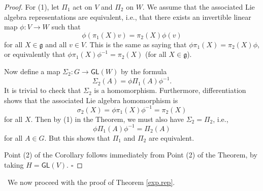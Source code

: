 \documentclass{amsbook}
\let \frak = \mathfrak
\theoremstyle{plain}
\numberwithin{equation}{chapter}
\numberwithin{theorem}{chapter}
\begin{document}
\begin{proof}
For (1), let $\Pi_{1}$ act on $V$ and $\Pi_{2}$ on $W$. We assume that the
associated Lie algebra representations are equivalent, i.e., that there exists
an invertible linear map $\phi:V\rightarrow W$ such that
\[
\phi\left(  \pi_{1}(X)v\right)  =\pi_{2}(X)\phi(v)
\]
for all $X\in\frak{g}$ and all $v\in V$. This is the same as saying that
$\phi\pi_{1}(X)=\pi_{2}(X)\phi$, or equivalently that $\phi\pi_{1}(X)\phi
^{-1}=\pi_{2}(X)$ (for all $X\in\frak{g}$).

Now define a map $\Sigma_{2}:G\rightarrow\mathsf{GL}(W)$ by the formula
\[
\Sigma_{2}(A)=\phi\Pi_{1}(A)\phi^{-1}\text{.}%
\]
It is trivial to check that $\Sigma_{2}$ is a homomorphism. Furthermore,
differentiation shows that the associated Lie algebra homomorphism is
\[
\sigma_{2}(X)=\phi\pi_{1}(X)\phi^{-1}=\pi_{2}(X)
\]
for all $X$. Then by (1) in the Theorem, we must also have $\Sigma_{2}=\Pi
_{2}$, i.e.,
\[
\phi\Pi_{1}(A)\phi^{-1}=\Pi_{2}(A)
\]
for all $A\in G$. But this shows that $\Pi_{1}$ and $\Pi_{2}$ are equivalent.

Point (2) of the Corollary follows immediately from Point (2) of the Theorem,
by taking $H=\mathsf{GL}(V)$. $\square$
\end{proof}

\ We now proceed with the proof of Theorem \ref{exp.rep}.
\end{document}

